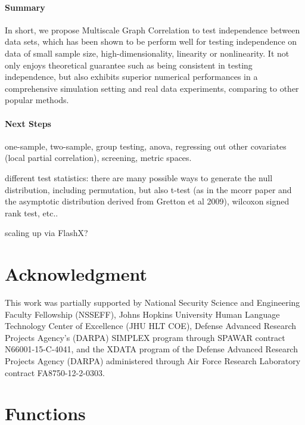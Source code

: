 \documentclass[11pt]{article}
\begin{document}
\paragraph{Summary}

In short, we propose Multiscale Graph Correlation to test independence between data sets, which has been shown to be perform well for testing independence on data of small sample size, high-dimensionality, linearity or nonlinearity. It not only enjoys theoretical guarantee such as being consistent in testing independence, but also exhibits superior numerical performances in a comprehensive simulation setting and real data experiments, comparing to other popular methods.


\paragraph{Next Steps}

one-sample, two-sample, group testing, anova, regressing out other covariates (local partial correlation), screening, metric spaces.

different test statistics: there are many possible ways to generate the null distribution, including permutation, but also t-test (as in the mcorr paper and the asymptotic distribution derived from Gretton et al 2009), wilcoxon signed rank test, etc..


scaling up via FlashX?

\section*{Acknowledgment}
This work was partially supported by 
% 
National Security Science and Engineering Faculty Fellowship (NSSEFF), 
% 
Johns Hopkins University Human Language Technology Center of Excellence (JHU HLT COE), 
% 
Defense Advanced Research Projects Agency's (DARPA) SIMPLEX program through SPAWAR contract N66001-15-C-4041, 
% 
and the XDATA program of the Defense Advanced Research Projects Agency (DARPA) administered through Air Force Research Laboratory contract FA8750-12-2-0303.



\appendix
\setcounter{figure}{0}
\renewcommand\thefigure{\arabic{figure}} 

\section{Functions}
\label{appen:a}
\end{document}
